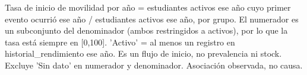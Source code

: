 Tasa de inicio de movilidad por año = estudiantes activos ese año cuyo primer evento ocurrió ese año / estudiantes activos ese año, por grupo. El numerador es un subconjunto del denominador (ambos restringidos a activos), por lo que la tasa está siempre en [0,100]. 'Activo' = al menos un registro en historial\_rendimiento ese año. Es un flujo de inicio, no prevalencia ni stock. Excluye 'Sin dato' en numerador y denominador. Asociación observada, no causa.
